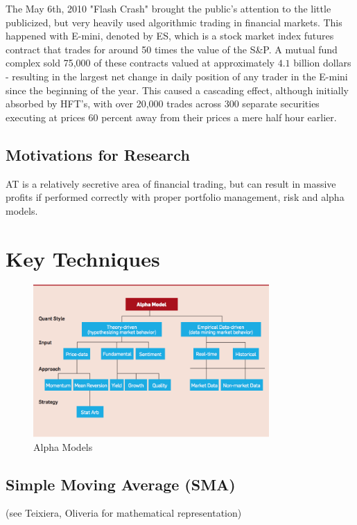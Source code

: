 \documentclass[letterpaper,11pt]{article}
\begin{document}
The May 6th, 2010 "Flash Crash" brought the public's attention to the little publicized, but very heavily used algorithmic trading in financial markets. This happened with E-mini, denoted by ES, which is a stock market index futures contract that trades for around 50 times the value of the S\&P. A mutual fund complex sold 75,000 of these contracts valued at approximately $4.1$ billion dollars - resulting in the largest net change in daily position of any trader in the E-mini since the beginning of the year. This caused a cascading effect, although initially absorbed by HFT's, with over 20,000 trades across 300 separate securities executing at prices 60 percent away from their prices a mere half hour earlier.  

\subsection*{Motivations for Research}

AT is a relatively secretive area of financial trading, but can result in massive profits if performed correctly with proper portfolio management, risk and alpha models. 

\section*{Key Techniques}

\begin{figure}[ht!]
\centering
\includegraphics[width=90mm]{alpha.png}
\caption{Alpha Models \label{overflow}}
\end{figure}

\subsection*{Simple Moving Average (SMA)}

(see Teixiera, Oliveria for mathematical representation)
\end{document}
